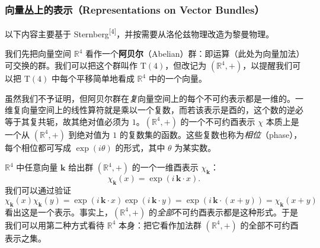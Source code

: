 \subsubsection{向量丛上的表示（Representations on Vector Bundles）}

以下内容主要基于 Sternberg\textsuperscript{[4]}，并按需要从洛伦兹物理改造为黎曼物理。

我们先把向量空间 $\mathbb{R}^4$ 看作一个\textbf{阿贝尔}（Abelian）群：即运算（此处为向量加法）可交换的群。我们可以把这个群叫作 $\mathrm{T}(4)$，但改记为 $(\mathbb{R}^4,+)$，以提醒我们可以把 $\mathrm{T}(4)$ 中每个平移简单地看成 $\mathbb{R}^4$ 中的一个向量。

虽然我们不予证明，但阿贝尔群在\emph{复}向量空间上的每个不可约表示都是一维的。一维复向量空间上的线性算符就是乘以一个复数，而若该表示是酉的，这个数的逆必等于其复共轭，故其绝对值必须为 $1$。$(\mathbb{R}^4,+)$ 的一个不可约酉表示 $\chi$ 本质上是一个从 $(\mathbb{R}^4,+)$ 到绝对值为 $1$ 的复数集的函数。这些复数也称为\emph{相位}（phase），每个相位都可写成 $\exp(i\theta)$ 的形式，其中 $\theta$ 为某实数。

$\mathbb{R}^4$ 中任意向量 $\mathbf{k}$ 给出群 $(\mathbb{R}^4,+)$ 的一个一维酉表示 $\chi_{\mathbf{k}}$：
\[
\chi_{\mathbf{k}}(x)=\exp(i\,\mathbf{k}\cdot x).
\]
我们可以通过验证
\[
\chi_{\mathbf{k}}(x)\chi_{\mathbf{k}}(y)=\exp(i\,\mathbf{k}\cdot x)\exp(i\,\mathbf{k}\cdot y)=\exp(i\,\mathbf{k}\cdot(x+y))=\chi_{\mathbf{k}}(x+y)
\]
看出这是一个表示。事实上，$(\mathbb{R}^4,+)$ 的\emph{全部}不可约酉表示都是这种形式。于是我们可以用第二种方式看待 $\mathbb{R}^4$ 本身：把它看作加法群 $(\mathbb{R}^4,+)$ 的全部不可约酉表示之集。

